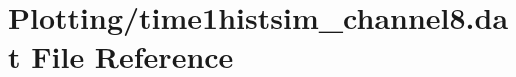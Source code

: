\hypertarget{Plotting_2time1histsim__channel8_8dat}{}\section{Plotting/time1histsim\+\_\+channel8.dat File Reference}
\label{Plotting_2time1histsim__channel8_8dat}
